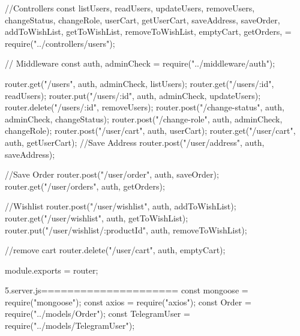 //Controllers
const {
  listUsers,
  readUsers,
  updateUsers,
  removeUsers,
  changeStatus,
  changeRole,
  userCart,
  getUserCart,
  saveAddress,
  saveOrder,
  addToWishList,
  getToWishList,
  removeToWishList,
  emptyCart,
  getOrders,
} = require("../controllers/users");

// Middleware
const { auth, adminCheck } = require("../middleware/auth");

router.get("/users", auth, adminCheck, listUsers);
router.get("/users/:id", readUsers);
router.put("/users/:id", auth, adminCheck, updateUsers);
router.delete("/users/:id", removeUsers);
router.post("/change-status", auth, adminCheck, changeStatus);
router.post("/change-role", auth, adminCheck, changeRole);
router.post("/user/cart", auth, userCart);
router.get("/user/cart", auth, getUserCart);
//Save Address
router.post("/user/address", auth, saveAddress);

//Save Order
router.post("/user/order", auth, saveOrder);
router.get("/user/orders", auth, getOrders);

//Wishlist
router.post("/user/wishlist", auth, addToWishList);
router.get("/user/wishlist", auth, getToWishList);
router.put("/user/wishlist/:productId", auth, removeToWishList);

//remove cart
router.delete("/user/cart", auth, emptyCart);



module.exports = router;



5.server\controllers\sendTelegram.js=====================
const mongoose = require("mongoose");
const axios = require("axios");
const Order = require("../models/Order");
const TelegramUser = require("../models/TelegramUser");

